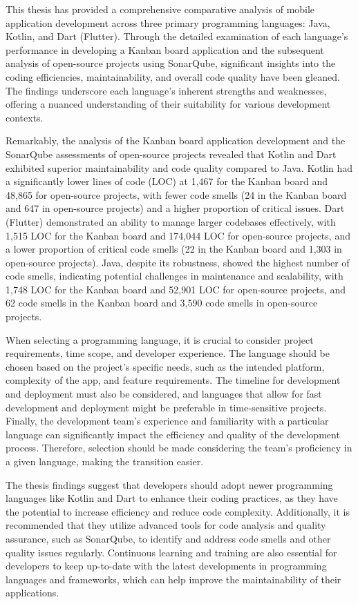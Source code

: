 This thesis has provided a comprehensive comparative analysis of mobile application development across three primary programming languages: Java, Kotlin, and Dart (Flutter). Through the detailed examination of each language's performance in developing a Kanban board application and the subsequent analysis of open-source projects using SonarQube, significant insights into the coding efficiencies, maintainability, and overall code quality have been gleaned. The findings underscore each language's inherent strengths and weaknesses, offering a nuanced understanding of their suitability for various development contexts.
\par
Remarkably, the analysis of the Kanban board application development and the SonarQube assessments of open-source projects revealed that Kotlin and Dart exhibited superior maintainability and code quality compared to Java. Kotlin had a significantly lower lines of code (LOC) at 1,467 for the Kanban board and 48,865 for open-source projects, with fewer code smells (24 in the Kanban board and 647 in open-source projects) and a higher proportion of critical issues. Dart (Flutter) demonstrated an ability to manage larger codebases effectively, with 1,515 LOC for the Kanban board and 174,044 LOC for open-source projects, and a lower proportion of critical code smells (22 in the Kanban board and 1,303 in open-source projects). Java, despite its robustness, showed the highest number of code smells, indicating potential challenges in maintenance and scalability, with 1,748 LOC for the Kanban board and 52,901 LOC for open-source projects, and 62 code smells in the Kanban board and 3,590 code smells in open-source projects.
\par
When selecting a programming language, it is crucial to consider project requirements, time scope, and developer experience. The language should be chosen based on the project's specific needs, such as the intended platform, complexity of the app, and feature requirements. The timeline for development and deployment must also be considered, and languages that allow for fast development and deployment might be preferable in time-sensitive projects. Finally, the development team's experience and familiarity with a particular language can significantly impact the efficiency and quality of the development process. Therefore, selection should be made considering the team's proficiency in a given language, making the transition easier.
\par
The thesis findings suggest that developers should adopt newer programming languages like Kotlin and Dart to enhance their coding practices, as they have the potential to increase efficiency and reduce code complexity. Additionally, it is recommended that they utilize advanced tools for code analysis and quality assurance, such as SonarQube, to identify and address code smells and other quality issues regularly. Continuous learning and training are also essential for developers to keep up-to-date with the latest developments in programming languages and frameworks, which can help improve the maintainability of their applications.
